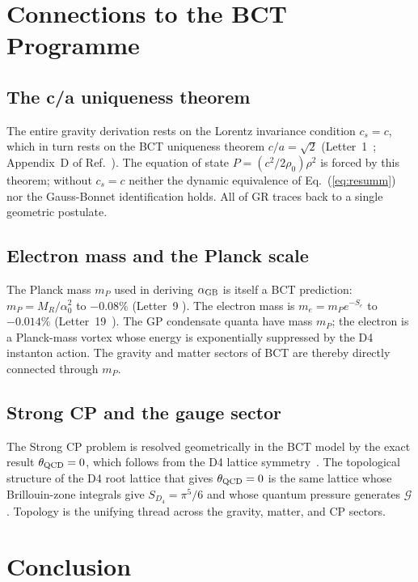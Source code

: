 \documentclass[twocolumn,10pt,a4paper]{article}
\begin{document}
\section*{Connections to the BCT Programme}

\subsection*{The c/a uniqueness theorem}
The entire gravity derivation rests on the Lorentz invariance condition
$c_s = c$, which in turn rests on the BCT uniqueness theorem
$c/a = \sqrt{2}$ (Letter~1~\cite{lorentz}; Appendix~D of
Ref.~\cite{monograph}). The equation of state $P = (c^2/2\rho_0)\rho^2$
is forced by this theorem; without $c_s = c$ neither the dynamic
equivalence of Eq.~(\ref{eq:resumm}) nor the Gauss-Bonnet identification
holds. All of GR traces back to a single geometric postulate.

\subsection*{Electron mass and the Planck scale}
The Planck mass $m_P$ used in deriving $\alpha_{\rm GB}$ is itself a
BCT prediction: $m_P = M_R/\alpha_0^2$ to $-0.08\%$ (Letter~9
\cite{planck}). The electron mass is $m_e = m_P e^{-S_e}$ to $-0.014\%$
(Letter~19~\cite{electron}). The GP condensate quanta have mass $m_P$;
the electron is a Planck-mass vortex whose energy is exponentially
suppressed by the D4 instanton action. The gravity and matter sectors
of BCT are thereby directly connected through $m_P$.

\subsection*{Strong CP and the gauge sector}
The Strong CP problem is resolved geometrically in the BCT model by
the exact result $\theta_{\rm QCD} = 0$, which follows from the D4
lattice symmetry~\cite{strongcp}. The topological structure of the D4
root lattice that gives $\theta_{\rm QCD} = 0$ is the same lattice
whose Brillouin-zone integrals give $S_{D_4} = \pi^5/6$ and whose
quantum pressure generates $\mathcal{G}$. Topology is the unifying
thread across the gravity, matter, and CP sectors.

\section*{Conclusion}
\end{document}
